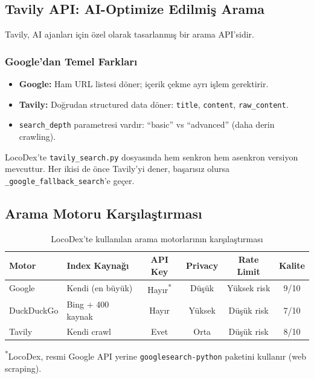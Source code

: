 \subsection{Tavily API: AI-Optimize Edilmi\c{s} Arama}
\label{subsec:tavily}

Tavily, AI ajanlar{\i} i\c{c}in \"{o}zel olarak tasarlanm{\i}\c{s} bir arama API'sidir.

\subsubsection{Google'dan Temel Farklar{\i}}

\begin{itemize}
  \item \textbf{Google:} Ham URL listesi d\"{o}ner; i\c{c}erik \c{c}ekme ayr{\i} i\c{s}lem gerektirir.
  \item \textbf{Tavily:} Do\u{g}rudan structured data d\"{o}ner: \texttt{title}, \texttt{content}, \texttt{raw\_content}.
  \item \texttt{search\_depth} parametresi vard{\i}r: ``basic'' vs ``advanced'' (daha derin crawling).
\end{itemize}

\noindent
LocoDex'te \texttt{tavily\_search.py} dosyas{\i}nda hem senkron hem asenkron versiyon mevcuttur. Her ikisi de \"{o}nce Tavily'yi dener, ba\c{s}ar{\i}s{\i}z olursa \texttt{\_google\_fallback\_search}'e ge\c{c}er.


\subsection{Arama Motoru Kar\c{s}{\i}la\c{s}t{\i}rmas{\i}}
\label{subsec:arama-karsilastirma}

\begin{table}[H]
\centering
\caption{LocoDex'te kullan{\i}lan arama motorlar{\i}n{\i}n kar\c{s}{\i}la\c{s}t{\i}rmas{\i}}
\label{tab:search-engines}
\begin{tabularx}{\textwidth}{lXcccc}
\toprule
\color{chapterBlue}\textbf{Motor} &
\color{chapterBlue}\textbf{Index Kayna\u{g}{\i}} &
\color{chapterBlue}\textbf{API Key} &
\color{chapterBlue}\textbf{Privacy} &
\color{chapterBlue}\textbf{Rate Limit} &
\color{chapterBlue}\textbf{Kalite} \\
\midrule
Google & Kendi (en b\"{u}y\"{u}k) & Hay{\i}r\textsuperscript{*} & D\"{u}\c{s}\"{u}k & Y\"{u}ksek risk & \color{codeGreen}9/10 \\
DuckDuckGo & Bing + 400 kaynak & Hay{\i}r & \color{codeGreen}Y\"{u}ksek & D\"{u}\c{s}\"{u}k risk & 7/10 \\
Tavily & Kendi crawl & Evet & Orta & D\"{u}\c{s}\"{u}k risk & 8/10 \\
\bottomrule
\end{tabularx}
\smallskip
{\small \textsuperscript{*}LocoDex, resmi Google API yerine \texttt{googlesearch-python} paketini kullan{\i}r (web scraping).}
\end{table}


